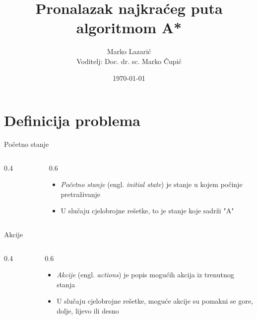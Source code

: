 \documentclass{beamer}
\title{Pronalazak najkraćeg puta algoritmom A*}
\date{\today}
\author{Marko Lazarić\\
Voditelj: Doc. dr. sc. Marko Čupić}
\newcommand{\engl}[1]{ (engl. \emph{#1})}
\newcommand{\twocolumns}[2]{
	\begin{columns}
		\begin{column}{0.4\textwidth}
			#1
		\end{column}
		\begin{column}{0.6\textwidth}  %
			#2
		\end{column}
	\end{columns}
}
\begin{document}
  \maketitle
  
  \section{Definicija problema}
  \begin{frame}{Početno stanje}	
  	\twocolumns{
	  \begin{figure}[H]
	  		\begin{tikzpicture}
	  		
	  		\end{tikzpicture}
	  \end{figure}
    }{
      \begin{itemize}
    	\item \emph{Početno stanje} \engl{initial state} je stanje u kojem počinje pretraživanje
      	\item U slučaju cjelobrojne rešetke, to je stanje koje sadrži "A"
      \end{itemize}
    }
  \end{frame}

  \begin{frame}{Akcije}
    \twocolumns{
    	\begin{figure}[H]
    		\begin{tikzpicture}
    		
    		\end{tikzpicture}
    	\end{figure}
    }{
	    \begin{itemize}
	    	\item \emph{Akcije} \engl{actions} je popis mogućih akcija iz trenutnog stanja
	    	\item U slučaju cjelobrojne rešetke, moguće akcije su pomakni se gore, dolje, lijevo ili desno
	    \end{itemize}
    }
  \end{frame}
\end{document}
